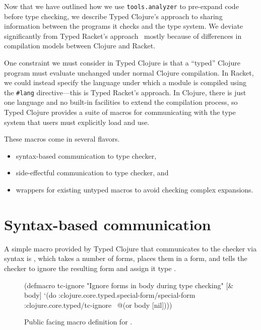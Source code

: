 Now that we have outlined how we use \texttt{tools.analyzer} to pre-expand code before type checking,
we describe Typed Clojure's approach to sharing information between the programs it checks
and the type system.
We deviate significantly from Typed Racket's approach~\cite{Culpepper07advancedmacrology}
mostly because of differences in compilation models between Clojure and Racket.

One constraint we must consider in Typed Clojure is that a ``typed'' Clojure program must
evaluate unchanged under normal Clojure compilation. In Racket, we could instead specify
the language under which a module is compiled using the \texttt{\#lang} directive---this is Typed
Racket's approach. 
In Clojure, there is just one language and no built-in facilities to extend the compilation
process, so Typed Clojure provides a suite of macros for communicating with the type system that
users must explicitly load and use.

These macros come in several flavors.

\begin{itemize}
  \item syntax-based communication to type checker,
  \item side-effectful communication to type checker, and
  \item wrappers for existing untyped macros to avoid checking complex expansions.
\end{itemize}

\section{Syntax-based communication}

A simple macro provided by Typed Clojure that communicates to the checker
via syntax is , which takes a number of forms, places
them in a  form, and tells the checker to ignore the resulting
form and assign it type .

\begin{figure}
\begin{cljlisting}
(defmacro tc-ignore 
  "Ignore forms in body during type checking"
  [& body]
  `(do :clojure.core.typed.special-form/special-form
       :clojure.core.typed/tc-ignore
       ~@(or body [nil])))
\end{cljlisting}
  \caption{Public facing macro definition for .}
  \label{fig:analyzer:tc-ignore}
\end{figure}


